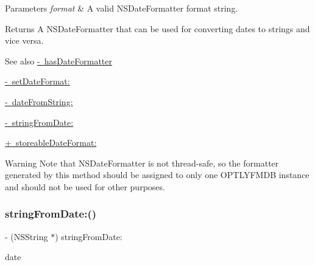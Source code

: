\begin{DoxyParams}{Parameters}
{\em format} & A valid N\+S\+Date\+Formatter format string.\\
\hline
\end{DoxyParams}
\begin{DoxyReturn}{Returns}
A {\ttfamily N\+S\+Date\+Formatter} that can be used for converting dates to strings and vice versa.
\end{DoxyReturn}
\begin{DoxySeeAlso}{See also}
\mbox{\hyperlink{interface_o_p_t_l_y_f_m_d_b_database_a820a1ababb4c5496800b9bcd5f2de784}{-\/ has\+Date\+Formatter}} 

\mbox{\hyperlink{interface_o_p_t_l_y_f_m_d_b_database_a48c1936bc68ddd11cea9aa177b0cc94e}{-\/ set\+Date\+Format\+:}} 

\mbox{\hyperlink{interface_o_p_t_l_y_f_m_d_b_database_a5368268fe8e6d881d0da4d3538607768}{-\/ date\+From\+String\+:}} 

\mbox{\hyperlink{interface_o_p_t_l_y_f_m_d_b_database_a60793c2b214e29c00143fdf9510837d7}{-\/ string\+From\+Date\+:}} 

\mbox{\hyperlink{interface_o_p_t_l_y_f_m_d_b_database_acb3eef48cd21dcb11407b88dac662c57}{+ storeable\+Date\+Format\+:}}
\end{DoxySeeAlso}
\begin{DoxyWarning}{Warning}
Note that {\ttfamily N\+S\+Date\+Formatter} is not thread-\/safe, so the formatter generated by this method should be assigned to only one O\+P\+T\+L\+Y\+F\+M\+DB instance and should not be used for other purposes. 
\end{DoxyWarning}
\mbox{\label{interface_o_p_t_l_y_f_m_d_b_database_a60793c2b214e29c00143fdf9510837d7}} 
\subsubsection{\texorpdfstring{string\+From\+Date\+:()}{stringFromDate:()}}
{\footnotesize\ttfamily -\/ (N\+S\+String $\ast$) string\+From\+Date\+: \begin{DoxyParamCaption}\item[{(N\+S\+Date $\ast$)}]{date }\end{DoxyParamCaption}}

